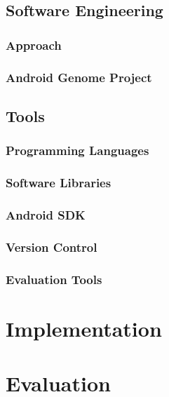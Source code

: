 \documentclass[12pt,twoside,notitlepage]{report}
\begin{document}
\section{Software Engineering}

\subsection{Approach}

\subsection{Android Genome Project}

\section{Tools}

\subsection{Programming Languages}

\subsection{Software Libraries}

\subsection{Android SDK}

\subsection{Version Control}

\subsection{Evaluation Tools}

\cleardoublepage
\chapter{Implementation}

\label{section:Code_Pseudoinstructions}


\cleardoublepage
\chapter{Evaluation}
\end{document}

